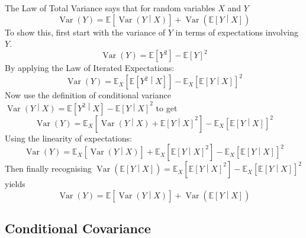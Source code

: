 \documentclass[11pt]{report} %
\begin{document}
The Law of Total Variance says that for random variables $X$ and $Y$
\begin{equation}
\operatorname{Var}\left(Y\right) = \mathbb{E}\left[\operatorname{Var}\left(Y\middle|X\right)\right] + \operatorname{Var}\left(\mathbb{E}\left[Y\middle|X\right]\right)
\end{equation}
To show this, first start with the variance of $Y$ in terms of expectations involving $Y$.
\begin{equation}
\operatorname{Var}\left(Y\right) = \mathbb{E}\left[Y^{2}\right] - \mathbb{E}\left[Y\right]^{2}
\end{equation}
By applying the Law of Iterated Expectations:
\begin{equation}
\operatorname{Var}\left(Y\right) = \mathbb{E}_{X}\left[\mathbb{E}\left[Y^{2}\middle|X\right]\right] - \mathbb{E}_{X}\left[\mathbb{E}\left[Y\middle|X\right]\right]^{2}
\end{equation}
Now use the definition of conditional variance $\operatorname{Var}\left(Y\middle|X\right) = \mathbb{E}\left[Y^{2}\middle|X\right] - \mathbb{E}\left[Y\middle|X\right]^{2}$ to get
\begin{equation}
\operatorname{Var}\left(Y\right) = \mathbb{E}_{X}\left[\operatorname{Var}\left(Y\middle|X\right) + \mathbb{E}\left[Y\middle|X\right]^{2}\right] - \mathbb{E}_{X}\left[\mathbb{E}\left[Y\middle|X\right]\right]^{2}
\end{equation}
Using the linearity of expectations:
\begin{equation}
\operatorname{Var}\left(Y\right) = \mathbb{E}_{X}\left[\operatorname{Var}\left(Y\middle|X\right)\right] + \mathbb{E}_{X}\left[\mathbb{E}\left[Y\middle|X\right]^{2}\right] - \mathbb{E}_{X}\left[\mathbb{E}\left[Y\middle|X\right]\right]^{2}
\end{equation}
Then finally recognising $\operatorname{Var}\left(\mathbb{E}\left[Y\middle|X\right]\right) = \mathbb{E}_{X}\left[\mathbb{E}\left[Y\middle|X\right]^{2}\right] - \mathbb{E}_{X}\left[\mathbb{E}\left[Y\middle|X\right]\right]^{2}$ yields
\begin{equation}
\operatorname{Var}\left(Y\right) = \mathbb{E}\left[\operatorname{Var}\left(Y\middle|X\right)\right] + \operatorname{Var}\left(\mathbb{E}\left[Y\middle|X\right]\right)
\end{equation}

\subsection{Conditional Covariance}
\end{document}
